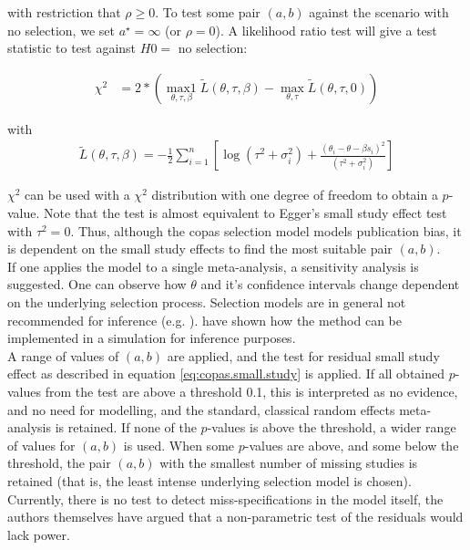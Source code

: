with restriction that $\rho \geq 0$. To test some pair $(a,b)$ against the scenario with no selection, we set $a^\star = \infty$ (or $\rho = 0$). A likelihood ratio test will give a test statistic to test against $H0 =$ no selection:

\begin{align}
\chi^2 &= 2*(\operatorname*{max1}_{\theta, \tau, \beta}\tilde{L}(\theta, \tau, \beta) - \operatorname*{max}_{\theta, \tau}\tilde{L}(\theta, \tau, 0)) \label{eq:copas.small.study}
\end{align}

with 
\begin{align}
\tilde{L}(\theta, \tau, \beta) = -\frac{1}{2}\sum_{i = 1}^n[\log(\tau^2 + \sigma_i^2) + \frac{(\theta_i - \theta - \beta s_i)^2}{(\tau^2 + \sigma_i^2)}] \nonumber
\end{align}

$\chi^2$ can be used with a $\chi^2$ distribution with one degree of freedom to obtain a $p$-value. Note that the test is almost equivalent to Egger's small study effect test with $\tau^2 = 0$. Thus, although the copas selection model models publication bias, it is dependent on the small study effects to find the most suitable pair $(a,b)$. \\
If one applies the model to a single meta-analysis, a sensitivity analysis is suggested. One can observe how $\theta$ and it's confidence intervals change dependent on the underlying selection process. Selection models are in general not recommended for inference (e.g. \citet{selection.assessment}). 
\citet{limitmeta} have shown how the method can be implemented in a simulation for inference purposes. \\
A range of values of $(a,b)$ are applied, and the test for residual small study effect as described in equation \ref{eq:copas.small.study} is applied. If all obtained $p$-values from the test are above a threshold 0.1, this is interpreted as no evidence, and no need for modelling, and the standard, classical random effects meta-analysis is retained. If none of the $p$-values is above the threshold, a wider range of values for $(a,b)$ is used. When some $p$-values are above, and some below the threshold, the pair $(a,b)$ with the smallest number of missing studies is retained (that is, the least intense underlying selection model is chosen).\\
Currently, there is no test to detect miss-specifications in the model itself, the authors themselves have argued that a non-parametric test of the residuals would lack power.


